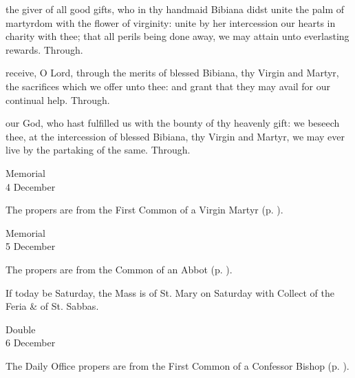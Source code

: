 \collect
{} the giver of all good gifts, who in thy handmaid Bibiana didst unite the palm of martyrdom with the flower of virginity: unite by her intercession our hearts in charity with thee; that all perils being done away, we may attain unto everlasting rewards. Through.

\secret
{} receive, O Lord, through the merits of blessed Bibiana, thy Virgin and Martyr, the sacrifices which we offer unto thee: and grant that they may avail for our continual help. Through.

\postcommunion
{} our God, who hast fulfilled us with the bounty of thy heavenly gift: we beseech thee, at the intercession of blessed Bibiana, thy Virgin and Martyr, we may ever live by the partaking of the same. Through.

\begin{inhead}
    {Memorial\\
4 December}
\end{inhead}

\begin{rubric}
	The propers are from the First Common of a Virgin Martyr (p. \pageref{CommonVirginMartyrI}).
\end{rubric}


\begin{inhead}
    {Memorial\\
5 December}
\end{inhead}

\begin{rubric}
	The propers are from the Common of an Abbot (p. \pageref{CommonAbbots}).
\end{rubric}

\begin{rubric}
	If today be Saturday, the Mass is of St. Mary on Saturday with  Collect of the Feria \&  of St. Sabbas.
\end{rubric}


\begin{inhead}
    {Double\\
6 December}
\end{inhead}

\begin{rubric}
	The Daily Office propers are from the First Common of a Confessor Bishop (p. \pageref{CommonConfessorBishopI}).
\end{rubric}

